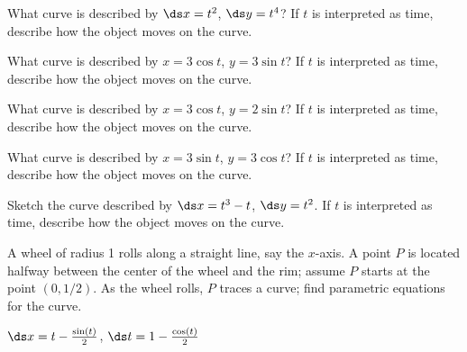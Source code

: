 \begin{enumialphparenastyle}

\begin{ex}
 What curve is described by $\ds x=t^2$, $\ds y=t^4$? If $t$ is
interpreted as time, describe how the object moves on the curve.
\end{ex}

\begin{ex}
 What curve is described by $x=3\cos t$, $y=3\sin t$? If $t$ is
interpreted as time, describe how the object moves on the curve.
\end{ex}

\begin{ex}
 What curve is described by $x=3\cos t$, $y=2\sin t$? If $t$ is
interpreted as time, describe how the object moves on the curve.
\end{ex}

\begin{ex}
 What curve is described by $x=3\sin t$, $y=3\cos t$? If $t$ is
interpreted as time, describe how the object moves on the curve.
\end{ex}

\begin{ex}
 Sketch the curve described by $\ds x=t^3-t$, $\ds y=t^2$. If $t$ is
interpreted as time, describe how the object moves on the curve.
\end{ex}

\begin{ex}\label{exer:pseudo cycloid}
 A wheel of radius 1 rolls along a straight line, say the
$x$-axis. A point $P$ is located halfway between the center of the
wheel and the rim; assume $P$ starts at the point $(0,1/2)$. As the
wheel rolls, $P$ traces a curve; find parametric equations for the
curve.
\begin{sol}
 $\ds x=t-{\sin(t)\over2}$, $\ds t=1-{\cos(t)\over2}$
\end{sol}
\end{ex}


\end{enumialphparenastyle}
